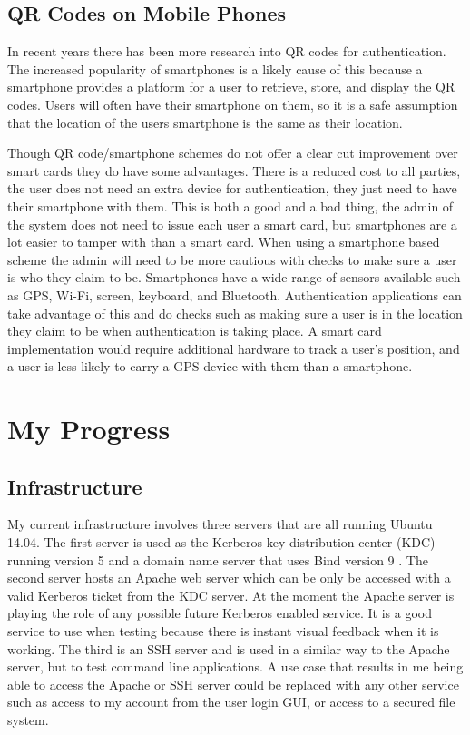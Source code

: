 \documentclass[]{report}   %
\begin{document}
\subsection{QR Codes on Mobile Phones}
In recent years there has been more research into QR codes for authentication. The increased popularity of smartphones is a likely cause of this because a smartphone provides a platform for a user to retrieve, store, and display the QR codes. Users will often have their smartphone on them, so it is a safe assumption that the location of the users smartphone is the same as their location.

Though QR code/smartphone schemes do not offer a clear cut improvement over smart cards they do have some advantages. There is a reduced cost to all parties, the user does not need an extra device for authentication, they just need to have their smartphone with them. This is both a good and a bad thing, the admin of the system does not need to issue each user a smart card, but smartphones are a lot easier to tamper with than a smart card. When using a smartphone based scheme the admin will need to be more cautious with checks to make sure a user is who they claim to be. Smartphones have a wide range of sensors available such as GPS, Wi-Fi, screen, keyboard, and Bluetooth. Authentication applications can take advantage of this and do checks such as making sure a user is in the location they claim to be when authentication is taking place. A smart card implementation would require additional hardware to track a user's position, and a user is less likely to carry a GPS device with them than a smartphone.

\section{My Progress}
\subsection{Infrastructure}
My current infrastructure involves three servers that are all running Ubuntu 14.04. The first server is used as the Kerberos key distribution center (KDC) running version 5 and a domain name server that uses Bind version 9 \cite{Bind}. The second server hosts an Apache web server which can be only be accessed with a valid Kerberos ticket from the KDC server. At the moment the Apache server is playing the role of any possible future Kerberos enabled service. It is a good service to use when testing because there is instant visual feedback when it is working. The third is an SSH server and is used in a similar way to the Apache server, but to test command line applications. A use case that results in me being able to access the Apache or SSH server could be replaced with any other service such as access to my account from the user login GUI, or access to a secured file system.
\end{document}
